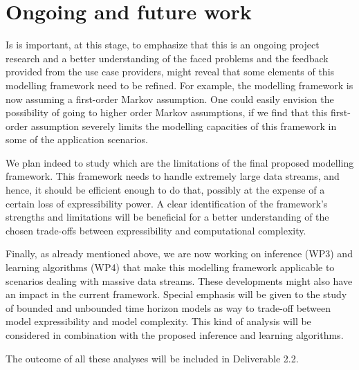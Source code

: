 \section{Ongoing and future work}\label{section:conclusions}

Is is important, at this stage, to emphasize that this is an ongoing project research and a better understanding of the faced problems and the feedback provided from the use case providers, might reveal that some elements of this modelling framework need to be refined.  For example, the modelling framework is now assuming a first-order Markov assumption. One could easily envision the possibility of going to higher order Markov assumptions, if we find that this first-order assumption severely limits the modelling capacities of this framework in some of the application scenarios. 

We plan indeed to study which are the limitations of the final proposed modelling framework. This framework needs to handle extremely large data streams, and hence, it should be efficient enough to do that, possibly at the expense of a certain loss of expressibility power. A clear identification of the framework's strengths and limitations will be beneficial for a better understanding of the chosen trade-offs between expressibility and computational complexity.

Finally, as already mentioned above,  we are now working on inference (WP3) and learning algorithms (WP4) that make this modelling framework applicable to scenarios dealing with massive data streams. These developments might also have an impact in the current framework. Special emphasis will be given to the study of bounded and unbounded time horizon models as way to trade-off between model expressibility and model complexity. This kind of analysis will be considered in combination with the proposed inference and learning algorithms.



The outcome of all these analyses will be included in Deliverable 2.2.
